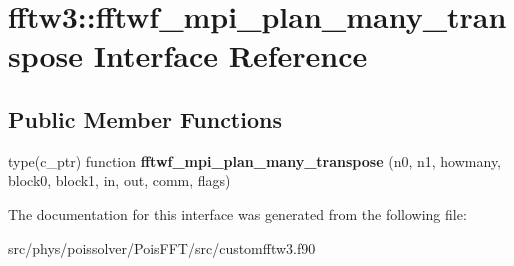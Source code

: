 \hypertarget{interfacefftw3_1_1fftwf__mpi__plan__many__transpose}{}\section{fftw3\+:\+:fftwf\+\_\+mpi\+\_\+plan\+\_\+many\+\_\+transpose Interface Reference}
\label{interfacefftw3_1_1fftwf__mpi__plan__many__transpose}
\subsection*{Public Member Functions}
\begin{DoxyCompactItemize}
\item 
type(c\+\_\+ptr) function {\bfseries fftwf\+\_\+mpi\+\_\+plan\+\_\+many\+\_\+transpose} (n0, n1, howmany, block0, block1, in, out, comm, flags)\hypertarget{interfacefftw3_1_1fftwf__mpi__plan__many__transpose_a98fee0cb13abda56c129f828d134b295}{}\label{interfacefftw3_1_1fftwf__mpi__plan__many__transpose_a98fee0cb13abda56c129f828d134b295}

\end{DoxyCompactItemize}


The documentation for this interface was generated from the following file\+:\begin{DoxyCompactItemize}
\item 
src/phys/poissolver/\+Pois\+F\+F\+T/src/customfftw3.\+f90\end{DoxyCompactItemize}
